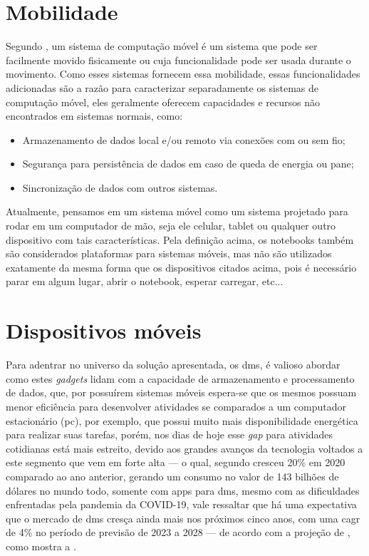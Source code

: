 \section{Mobilidade}\label{sec:mobilidade}
Segundo \citet{b2004mobile}, um sistema de computação móvel é um sistema que pode ser facilmente movido fisicamente ou cuja funcionalidade pode ser usada durante o movimento. Como esses sistemas fornecem essa mobilidade, essas funcionalidades adicionadas são a razão para caracterizar separadamente os sistemas de computação móvel, eles geralmente oferecem capacidades e recursos não encontrados em sistemas normais, como: 
 \begin{itemize}
   \item Armazenamento de dados local e/ou remoto via conexões com ou sem fio;
   \item Segurança para persistência de dados em caso de queda de energia ou pane;
   \item Sincronização de dados com outros sistemas.
 \end{itemize}

Atualmente, pensamos em um sistema móvel como um sistema projetado para rodar em um computador de mão, seja ele celular, tablet ou qualquer outro dispositivo com tais características. Pela definição acima, os notebooks também são considerados plataformas para sistemas móveis, mas não são utilizados exatamente da mesma forma que os dispositivos citados acima, pois é necessário parar em algum lugar, abrir o notebook, esperar carregar, etc...

\section{Dispositivos móveis}\label{sec:dm}
Para adentrar no universo da solução apresentada, os \acp{dm}, é valioso abordar como estes \textit{gadgets} lidam com a capacidade de armazenamento e processamento de dados, que, por possuírem sistemas móveis espera-se que os mesmos possuam menor eficiência para desenvolver atividades se comparados a um computador estacionário (\ac{pc}), por exemplo, que possui muito mais disponibilidade energética para realizar suas tarefas, porém, nos dias de hoje esse \textit{gap} para atividades cotidianas está mais estreito, devido aos grandes avanços da tecnologia voltados a este segmento que vem em forte alta — o qual, segundo \citet{data.ai} cresceu 20\% em 2020 comparado ao ano anterior, gerando um consumo no valor de 143 bilhões de dólares no mundo todo, somente com \acp{app} para \acp{dm}, mesmo com as dificuldades enfrentadas pela pandemia da COVID-19, vale ressaltar que há uma expectativa que o mercado de \acp{dm} cresça ainda mais nos próximos cinco anos, com uma \ac{cagr} de 4\% no período de previsão de 2023 a 2028 — de acordo com a projeção de \cite{intelligence_2023}, como mostra a . 

